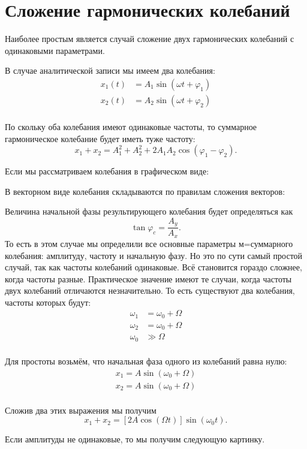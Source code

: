 \section{Сложение гармонических колебаний}

Наиболее простым является случай сложение двух гармонических колебаний с
одинаковыми параметрами.

В случае аналитической записи мы имеем два колебания:
\begin{align*}
	x_1(t) & = A_1 \sin(\omega t + \varphi_1) \\
	x_2(t) & = A_2 \sin(\omega t + \varphi_2) \\
\end{align*}

По скольку оба колебания имеют одинаковые частоты, то суммарное
гармоническое колебание будет иметь туже частоту: \[
	x_1 + x_2 = A_1^2 + A_2^2 + 2 A_1 A_2 \cos (\varphi_1 - \varphi_2)
	.\]

Если мы рассматриваем колебания в графическом виде:

В векторном виде колебания складываются по правилам сложения векторов:

Величина начальной фазы результирующего колебания будет определяться как \[
	\tan \varphi_c = \frac{A_y}{A_x}
	.\] То есть в этом случае мы определили все основные параметры м=суммарного
колебания: амплитуду, частоту и начальную фазу. Но это по сути самый простой
случай, так как частоты колебаний одинаковые. Всё становится гораздо сложнее,
когда частоты разные. Практическое значение имеют те случаи, когда частоты
двух колебаний отличаются незначительно. То есть существуют два колебания,
частоты которых будут:
\begin{align*}
	\omega_1 & = \omega_0 + \Omega \\
	\omega_2 & = \omega_0 + \Omega \\
	\omega_0 & \gg \Omega          \\
\end{align*}

Для простоты возьмём, что начальная фаза одного из колебаний равна нулю:
\begin{align*}
	x_1 = A \sin(\omega_0 + \Omega) \\
	x_2 = A \sin(\omega_0 + \Omega) \\
\end{align*}

Сложив два этих выражения мы получим \[
	x_1 + x_2 = [2 A \cos (\Omega t)] \sin (\omega_0 t)
	.\]

Если амплитуды не одинаковые, то мы получим следующую картинку.

